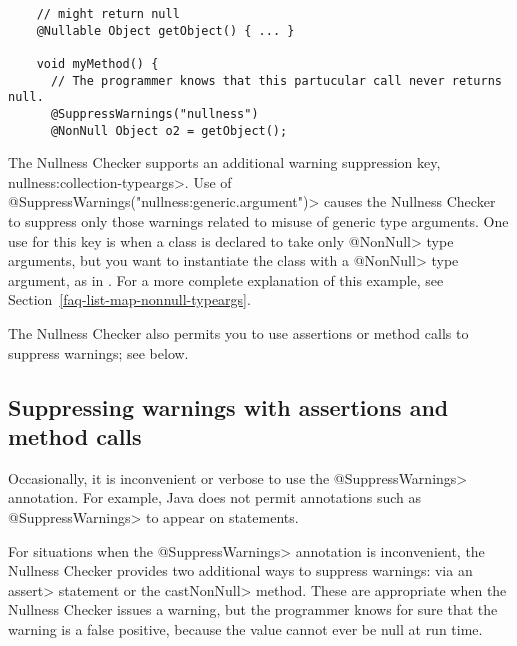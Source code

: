 \begin{Verbatim}
    // might return null
    @Nullable Object getObject() { ... }

    void myMethod() {
      // The programmer knows that this partucular call never returns null.
      @SuppressWarnings("nullness")
      @NonNull Object o2 = getObject();
\end{Verbatim}


The Nullness Checker supports an additional warning suppression key, 
\<nullness:collection-typeargs>.
Use of \<@SuppressWarnings("nullness:generic.argument")> causes the Nullness
Checker to suppress only those warnings related to misuse of generic type
arguments.  One use for this key is when a class is declared to take only
\<@NonNull> type arguments, but you want to instantiate the class with a
\<@NonNull> type argument, as in .  For a more
complete explanation of this example, see
Section~\ref{faq-list-map-nonnull-typeargs}.

The Nullness Checker also permits you to use assertions or method calls to
suppress warnings; see below.



\subsection{Suppressing warnings with assertions and method calls\label{suppressing-warnings-with-assertions}}

Occasionally, it is inconvenient or
verbose to use the \<@SuppressWarnings> annotation.  For example, Java does
not permit annotations such as \<@SuppressWarnings> to appear on statements.

For situations when the \<@SuppressWarnings> annotation is inconvenient,
the Nullness Checker provides two additional ways to suppress warnings:
via an \<assert> statement or the \<castNonNull> method.  These are
appropriate when the Nullness Checker issues a warning, but the programmer
knows for sure that the warning is a false positive, because the value
cannot ever be null at run time.

\newcommand{\nullnessSuppressionString}{nullness}

